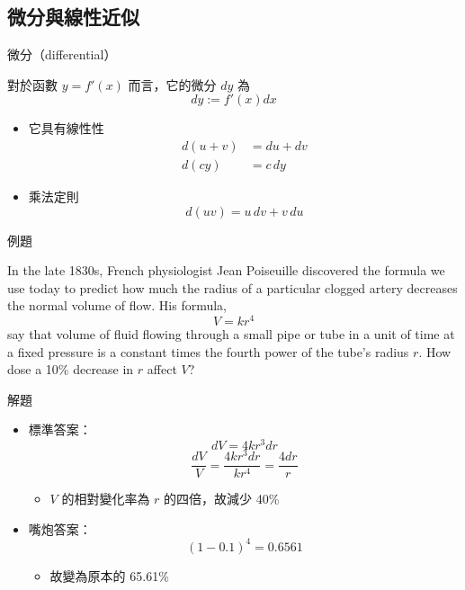 \documentclass{beamer}
\begin{document}
\begin{CJK}{UTF8}{bsmi}
\subsection{微分與線性近似}
\begin{frame}{微分（differential）}
  \begin{definition}
    對於函數 $y = f'(x)$ 而言，它的微分 $dy$ 為
    \[dy := f'(x) dx\]
  \end{definition}
  \begin{theorem}
    \begin{itemize}
      \item 它具有線性性
	\begin{align*}
	  d(u + v) &= du + dv\\
	  d(cy) &= c\,dy
	\end{align*}
      \item 乘法定則
	\[d(uv) = u\,dv + v\,du\]
    \end{itemize}
  \end{theorem}
\end{frame}

\begin{frame}{例題}
  \begin{example}
    In the late 1830s, French physiologist Jean Poiseuille discovered the formula we use today to predict how much the radius
    of a particular clogged artery decreases the normal volume of flow. His formula,
      \[V = kr^4\]
    say that volume of fluid flowing through a small pipe or tube in a unit of time at a fixed pressure is a constant times the
    fourth power of the tube’s radius $r$. How dose a 10\% decrease in $r$ affect $V$?
  \end{example}
\end{frame}

\begin{frame}{解題}
  \begin{solution}
    \begin{itemize}
      \item 標準答案：
	\[dV = 4kr^3 dr\]
	\[\frac{dV}{V} = \frac{4kr^3 dr}{kr^4} = \frac{4dr}{r}\]
	\begin{itemize}
	  \item $V$ 的相對變化率為 $r$ 的四倍，故減少 40\%
	\end{itemize}
      \item 嘴炮答案：
	\[(1 - 0.1)^4 = 0.6561\]
	\begin{itemize}
	  \item 故變為原本的 65.61\%
	\end{itemize}
    \end{itemize}
  \end{solution}
\end{frame}


\end{CJK}
\end{document}

